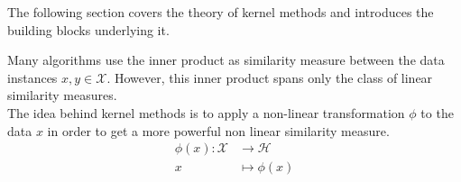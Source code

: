 The following section covers the theory of kernel methods and introduces the building blocks underlying it.


Many algorithms use the inner product as similarity measure between the data instances $x, y \in \mathcal{X}$. However, this inner product spans only the class of linear similarity measures. 
\\
The idea behind kernel methods is to apply a non-linear transformation $\phi$ to the data $x$ 
in order to get a more powerful non linear similarity measure.
\begin{align*}
\phi(x)\colon \mathcal{X} &\to \mathcal{H}
    \\
    x&\mapsto \phi(x)
\end{align*}


